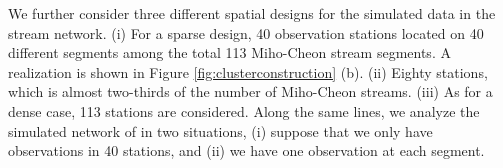 \documentclass[11pt,titlepage]{article}
\begin{document}




We further consider three different spatial designs for the simulated data in the stream network. (i) For a sparse design, 40 observation stations located on 40 different segments among the total 113 Miho-Cheon stream segments. A realization is shown in Figure \ref{fig:clusterconstruction} (b). (ii) Eighty stations, which is almost two-thirds of the number of Miho-Cheon streams.  (iii) As for a dense case, 113 stations are considered. Along the same lines, we analyze the simulated network of \cite{Gallacher2017} in two situations, (i) suppose that we only have observations in 40 stations, and (ii) we have one observation at each segment. 
\end{document}
